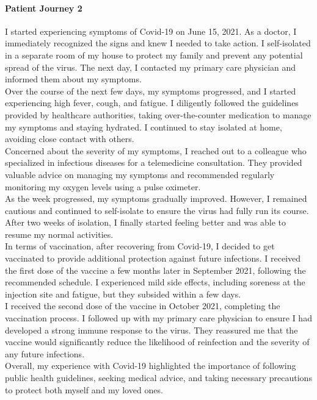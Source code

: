 \paragraph{Patient Journey 2}\label{apx:pj2}
I started experiencing symptoms of Covid-19 on June 15, 2021. As a doctor, I immediately recognized the signs and knew I needed to take action. I self-isolated in a separate room of my house to protect my family and prevent any potential spread of the virus. The next day, I contacted my primary care physician and informed them about my symptoms.\\
Over the course of the next few days, my symptoms progressed, and I started experiencing high fever, cough, and fatigue. I diligently followed the guidelines provided by healthcare authorities, taking over-the-counter medication to manage my symptoms and staying hydrated. I continued to stay isolated at home, avoiding close contact with others.\\
Concerned about the severity of my symptoms, I reached out to a colleague who specialized in infectious diseases for a telemedicine consultation. They provided valuable advice on managing my symptoms and recommended regularly monitoring my oxygen levels using a pulse oximeter.\\
As the week progressed, my symptoms gradually improved. However, I remained cautious and continued to self-isolate to ensure the virus had fully run its course. After two weeks of isolation, I finally started feeling better and was able to resume my normal activities.\\
In terms of vaccination, after recovering from Covid-19, I decided to get vaccinated to provide additional protection against future infections. I received the first dose of the vaccine a few months later in September 2021, following the recommended schedule. I experienced mild side effects, including soreness at the injection site and fatigue, but they subsided within a few days.\\
I received the second dose of the vaccine in October 2021, completing the vaccination process. I followed up with my primary care physician to ensure I had developed a strong immune response to the virus. They reassured me that the vaccine would significantly reduce the likelihood of reinfection and the severity of any future infections.\\
Overall, my experience with Covid-19 highlighted the importance of following public health guidelines, seeking medical advice, and taking necessary precautions to protect both myself and my loved ones.
